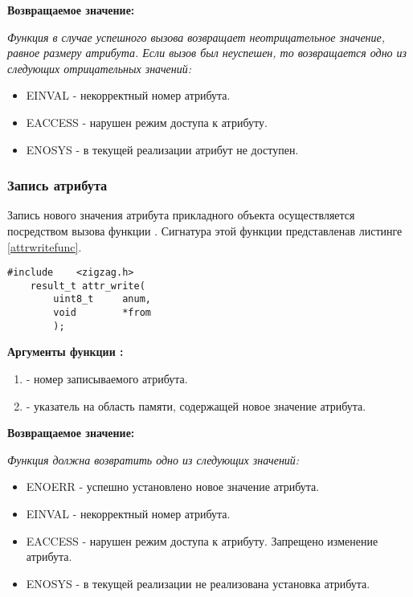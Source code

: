 {\bfseries Возвращаемое значение:}

{\itshape
Функция  в случае успешного вызова возвращает неотрицательное значение, равное
размеру атрибута. Если вызов был неуспешен, то возвращается одно из следующих отрицательных значений:
\begin{itemize}
\item EINVAL - некорректный номер атрибута.
\item EACCESS - нарушен режим доступа к атрибуту.
\item ENOSYS - в текущей реализации атрибут не доступен.
\end{itemize}
}

\subsubsection{Запись атрибута}

Запись нового значения атрибута прикладного объекта осуществляется посредством вызова функции . 
Сигнатура этой функции представленав листинге \ref{attrwritefunc}.

\begin{lstlisting}[caption=Функция \myfunc{attr\_write()} - запись атрибута. , label=attrwritefunc ]
    #include    <zigzag.h>
    result_t attr_write(
        uint8_t     anum,
        void        *from
        );
\end{lstlisting}

{\bfseries Аргументы функции :}

{\itshape
\begin{enumerate}
\item {} - номер записываемого атрибута.
\item {} - указатель на область памяти, содержащей новое значение атрибута.
\end{enumerate}
}

{\bfseries Возвращаемое значение:}

{\itshape
Функция  должна возвратить одно из следующих значений:
\begin{itemize}
\item ENOERR - успешно установлено новое значение атрибута.
\item EINVAL - некорректный номер атрибута.
\item EACCESS - нарушен режим доступа к атрибуту. Запрещено изменение атрибута.
\item ENOSYS - в текущей реализации не реализована установка атрибута.
\end{itemize}
}

